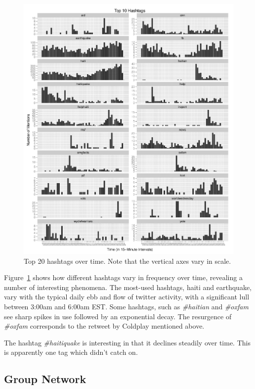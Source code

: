 \documentclass[a4paper, 11pt, titlepage]{article}
\begin{document}
\begin{figure}[h]
\centering
\includegraphics[width=\textwidth]{../figures/top-20-hashtags.pdf}
\caption{Top 20 hashtags over time. Note that the vertical axes vary in scale.}
\label{fig:hashtag_counts_over_time}
\end{figure}

Figure~\ref{fig:hashtag_counts_over_time} shows how different hashtags vary in frequency over time, revealing a number of interesting phenomena. The most-used hashtags, haiti and earthquake, vary with the typical daily ebb and flow of twitter activity, with a significant lull  between 3:00am and 6:00am EST. Some hashtags, such as \textit{\#haitian} and \textit{\#oxfam} see sharp spikes in use followed by an exponential decay. The resurgence of \textit{\#oxfam} corresponds to the retweet by Coldplay mentioned above.

The hashtag \textit{\#haitiquake} is interesting in that it declines steadily over time. This is apparently one tag which didn't catch on.

\subsection{Group Network}
\end{document}
